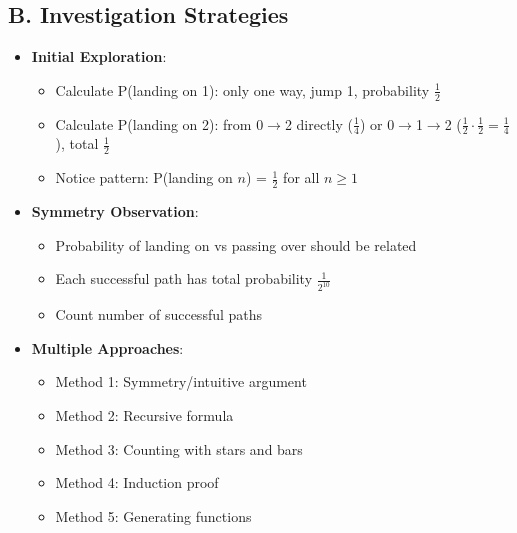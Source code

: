 \documentclass[11pt]{article}
\begin{document}
\begin{strategybox}
\subsection*{B. Investigation Strategies}
\begin{itemize}[leftmargin=*]
    \item \textbf{Initial Exploration}:
    \begin{itemize}
        \item Calculate P(landing on 1): only one way, jump 1, probability $\frac{1}{2}$
        \item Calculate P(landing on 2): from 0$\to$2 directly ($\frac{1}{4}$) or 0$\to$1$\to$2 ($\frac{1}{2} \cdot \frac{1}{2} = \frac{1}{4}$), total $\frac{1}{2}$
        \item Notice pattern: P(landing on $n$) = $\frac{1}{2}$ for all $n \geq 1$
    \end{itemize}
    \item \textbf{Symmetry Observation}:
    \begin{itemize}
        \item Probability of landing on vs passing over should be related
        \item Each successful path has total probability $\frac{1}{2^{10}}$
        \item Count number of successful paths
    \end{itemize}
    \item \textbf{Multiple Approaches}:
    \begin{itemize}
        \item Method 1: Symmetry/intuitive argument
        \item Method 2: Recursive formula
        \item Method 3: Counting with stars and bars
        \item Method 4: Induction proof
        \item Method 5: Generating functions
    \end{itemize}
\end{itemize}


\end{strategybox}
\end{document}
